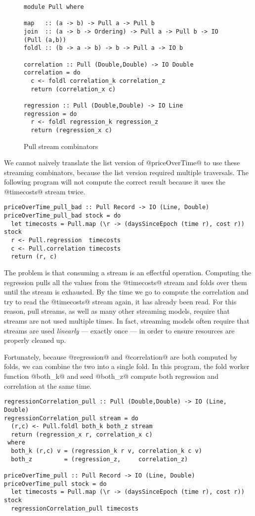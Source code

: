 \begin{figure}
\begin{lstlisting}
module Pull where

map   :: (a -> b) -> Pull a -> Pull b
join  :: (a -> b -> Ordering) -> Pull a -> Pull b -> IO (Pull (a,b))
foldl :: (b -> a -> b) -> b -> Pull a -> IO b

correlation :: Pull (Double,Double) -> IO Double
correlation = do
  c <- foldl correlation_k correlation_z
  return (correlation_x c)

regression :: Pull (Double,Double) -> IO Line
regression = do
  r <- foldl regression_k regression_z
  return (regression_x c)
\end{lstlisting}
\caption{Pull stream combinators}
\label{figs/impl/pull/combinator}
\end{figure}

We cannot naively translate the list version of @priceOverTime@ to use these streaming combinators, because the list version required multiple traversals.
The following program will not compute the correct result because it uses the @timecosts@ stream twice.

\begin{lstlisting}
priceOverTime_pull_bad :: Pull Record -> IO (Line, Double)
priceOverTime_pull_bad stock = do
  let timecosts = Pull.map (\r -> (daysSinceEpoch (time r), cost r)) stock
  r <- Pull.regression  timecosts
  c <- Pull.correlation timecosts
  return (r, c)
\end{lstlisting}

The problem is that consuming a stream is an effectful operation.
Computing the regression pulls all the values from the @timecosts@ stream and folds over them until the stream is exhausted.
By the time we go to compute the correlation and try to read the @timecosts@ stream again, it has already been read.
For this reason, pull streams, as well as many other streaming models, require that streams are not used multiple times.
In fact, streaming models often require that streams are used \emph{linearly} --- exactly once --- in order to ensure resources are properly cleaned up.

Fortunately, because @regression@ and @correlation@ are both computed by folds, we can combine the two into a single fold.
In this program, the fold worker function @both_k@ and seed @both_z@ compute both regression and correlation at the same time.

\begin{lstlisting}
regressionCorrelation_pull :: Pull (Double,Double) -> IO (Line, Double)
regressionCorrelation_pull stream = do
  (r,c) <- Pull.foldl both_k both_z stream
  return (regression_x r, correlation_x c)
 where
  both_k (r,c) v = (regression_k r v, correlation_k c v)
  both_z         = (regression_z,     correlation_z)

priceOverTime_pull :: Pull Record -> IO (Line, Double)
priceOverTime_pull stock = do
  let timecosts = Pull.map (\r -> (daysSinceEpoch (time r), cost r)) stock
  regressionCorrelation_pull timecosts
\end{lstlisting}

